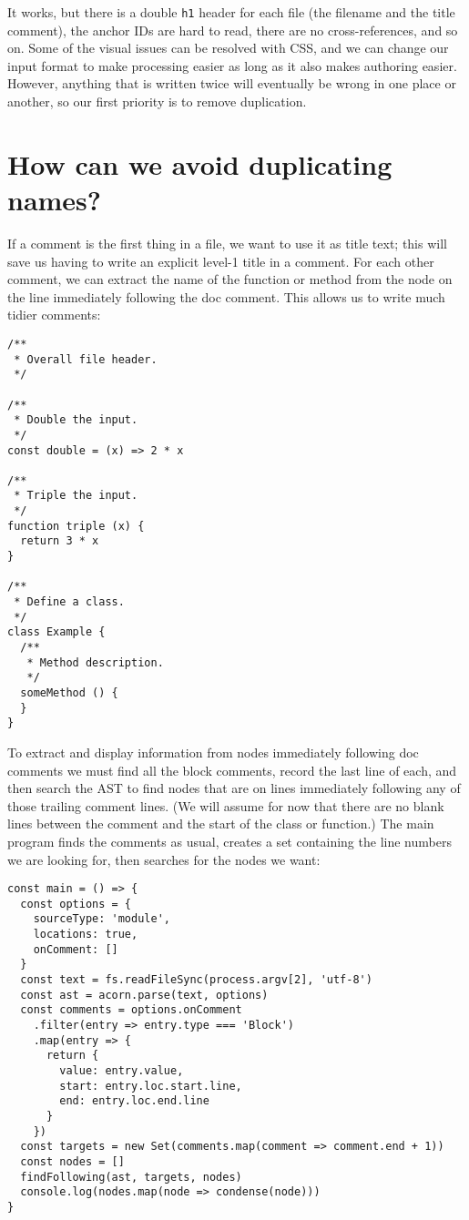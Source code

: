 \documentclass[krantzl]{krantz}
\begin{document}
It works,
but there is a double \texttt{h1} header for each file (the filename and the title comment),
the anchor IDs are hard to read,
there are no cross-references,
and so on.
Some of the visual issues can be resolved with CSS,
and we can change our input format to make processing easier
as long as it also makes authoring easier.
However,
anything that is written twice will eventually be wrong in one place or another,
so our first priority is to remove duplication.

\section{How can we avoid duplicating names?}\label{doc-generator-dup}


If a comment is the first thing in a file,
we want to use it as title text;
this will save us having to write an explicit level-1 title in a comment.
For each other comment,
we can extract the name of the function or method
from the node on the line immediately following the doc comment.
This allows us to write much tidier comments:


\begin{lstlisting}[frame=tblr]
/**
 * Overall file header.
 */

/**
 * Double the input.
 */
const double = (x) => 2 * x

/**
 * Triple the input.
 */
function triple (x) {
  return 3 * x
}

/**
 * Define a class.
 */
class Example {
  /**
   * Method description.
   */
  someMethod () {
  }
}
\end{lstlisting}



To extract and display information from nodes immediately following doc comments
we must find all the block comments,
record the last line of each,
and then search the AST to find nodes that are on lines
immediately following any of those trailing comment lines.
(We will assume for now that there are no blank lines between the comment
and the start of the class or function.)
The main program finds the comments as usual,
creates a set containing the line numbers we are looking for,
then searches for the nodes we want:


\begin{lstlisting}[frame=tblr]
const main = () => {
  const options = {
    sourceType: 'module',
    locations: true,
    onComment: []
  }
  const text = fs.readFileSync(process.argv[2], 'utf-8')
  const ast = acorn.parse(text, options)
  const comments = options.onComment
    .filter(entry => entry.type === 'Block')
    .map(entry => {
      return {
        value: entry.value,
        start: entry.loc.start.line,
        end: entry.loc.end.line
      }
    })
  const targets = new Set(comments.map(comment => comment.end + 1))
  const nodes = []
  findFollowing(ast, targets, nodes)
  console.log(nodes.map(node => condense(node)))
}
\end{lstlisting}
\end{document}
